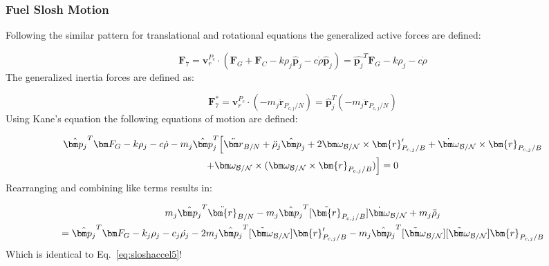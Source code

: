\subsubsection{Fuel Slosh Motion}
Following the similar pattern for translational and rotational equations the generalized active forces are defined:

\begin{equation}
	\bm F_{7} = \bm v^{P_c}_{r} \cdot (\bm F_G + \bm F_C -k\rho_j \hat{\bm p}_j - c \dot{\rho} \hat{\bm p}_j) = \hat{\bm p_j}^T \bm F_G -k\rho_j - c \dot{\rho}
\end{equation}
The generalized inertia forces are defined as:

\begin{equation}
	\bm F^*_{7} = \bm v^{P_c}_{r} \cdot (-m_j \ddot{\bm r}_{P_{c,j}/N}) = \hat{\bm p}_j^T (-m_j \ddot{\bm r}_{P_{c,j}/N})
\end{equation}
Using Kane's equation the following equations of motion are defined:

\begin{multline}
	\hat{\bm p_j}^T \bm F_G -k\rho_j - c \dot{\rho} - m_j \hat{\bm p}_j^T \Big[\ddot{\bm r}_{B/N} + \ddot{\rho}_j \hat{\bm p}_j  +2 \bm\omega_{\cal B/N} \times \bm{r}'_{P_{c,j}/B} + \dot{\bm\omega}_{\cal B/N} \times \bm{r}_{P_{c,j}/B}  \\
	+\bm\omega_{\cal B/N} \times (\bm\omega_{\cal B/N} \times \bm{r}_{P_{c,j}/B})\Big] = 0
\end{multline}
Rearranging and combining like terms results in:

\begin{multline}
	m_j \hat{\bm p_j}^T \ddot{\bm{r}}_{B/N} - m_j \hat{\bm p_j}^T [\tilde{\bm{r}}_{P_{c,j}/B}] \dot{\bm\omega}_{\cal B/N} + m_j \ddot{\rho}_j  \\
	= \hat{\bm p_j}^T \bm F_G - k_j \rho_j - c_j \dot{\rho_j} - 2 m_j \hat{\bm p_j}^T  [\tilde{\bm\omega}_{\cal B/N}] \bm{r}'_{P_{c,j}/B}  - m_j \hat{\bm p_j}^T [\tilde{\bm\omega}_{\cal B/N}] [\tilde{\bm\omega}_{\cal B/N}] \bm{r}_{P_{c,j}/B}
	\label{eq:sloshaccel6}
\end{multline}
Which is identical to Eq.~\eqref{eq:sloshaccel5}!
